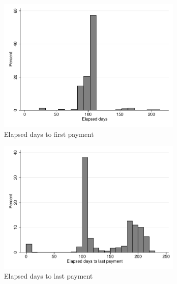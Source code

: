 \documentclass[11pt]{article}
\begin{document}
\begin{figure}[H]
    \caption{Behavior of those who lost pawn}
    \label{proxy_naive}
    \begin{center}
    \begin{subfigure}{0.40\textwidth}
        \caption{Elapsed days to first payment}
        \centering
        \includegraphics[width=\textwidth]{Figuras/hist_firstdays_default.pdf}
    \end{subfigure}
    \begin{subfigure}{0.40\textwidth}
        \caption{Elapsed days to last payment}
        \centering
        \includegraphics[width=\textwidth]{Figuras/hist_days_default.pdf}
    \end{subfigure}
        \begin{subfigure}{0.40\textwidth}

\end{subfigure}
\end{center}
\end{figure}
\end{document}
